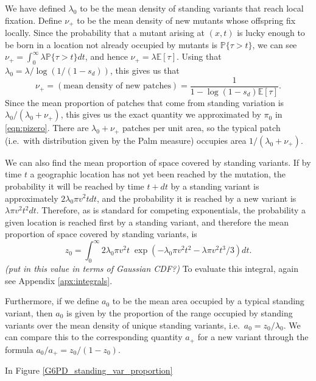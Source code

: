 \documentclass{article}
\renewcommand{\P}{\mathbb{P}}
\newcommand{\E}{\mathbb{E}}
\newcommand{\marginnote}[1]{{\it\color{red}(#1)}}
\begin{document}

We have defined $\lambda_0$ to be the mean density of standing variants that reach local fixation.
Define $\nu_+$ to be the mean density of new mutants whose offspring fix locally.
Since the probability that a mutant arising at $(x,t)$ is lucky enough to be born in a location not already occupied by mutants
is $\P\{ \tau > t \}$,
we can see  $\nu_+ = \int_0^\infty \lambda \P\{\tau>t\} dt$, and hence
$\nu_+ = \lambda \E[\tau] $.
Using that $\lambda_0 = \lambda / \log(1/(1-s_d))$, this gives us that
\begin{equation}
    \nu_+ = (\mbox{mean density of new patches}) = \frac{1}{1-\log(1-s_d) \E[\tau]} .
\end{equation}
Since the mean proportion of patches that come from standing variation is $\lambda_0 / (\lambda_0 + \nu_+)$,
this gives us the exact quantity we approximated by $\pi_0$ in \eqref{eqn:pizero}.
There are $\lambda_0 + \nu_+$ patches per unit area, so
the typical patch (i.e.\ with distribution given by the Palm measure) occupies area $1/(\lambda_0 + \nu_+)$.

We can also find the mean proportion of space covered by standing variants.
If by time $t$ a geographic location has not yet been reached by the mutation,
the probability it will be reached by time $t+dt$ 
by a standing variant is approximately $2 \lambda_0 \pi v^2 t dt$, 
and the probability it is reached by a new variant is $\lambda \pi v^2 t^2 dt$.
Therefore, as is standard for competing exponentials,
the probability a given location is reached first by a standing variant,
and therefore the mean proportion of space covered  by standing variants,
is
\begin{equation}
    z_0 = \int_0^\infty {2 \lambda_0 \pi v^2 t} \; \exp \left( - \lambda_0 \pi v^2 t^2 - \lambda \pi v^2 t^3 / 3 \right) dt .
\end{equation}
\marginnote{put in this value in terms of Gaussian CDF?}
To evaluate this integral, again see Appendix \ref{apx:integrals}.

Furthermore, if we define $a_0$ to be the mean area occupied by a typical standing variant, 
then $a_0$ is given by the proportion of the range occupied by standing variants over the mean density of unique standing variants,
i.e.\ $a_0 = z_0 / \lambda_0$.
We can compare this to the corresponding quantity $a_+$ for a new variant through the formula
$a_0 / a_+ = z_0 / (1-z_0)$.

In Figure \ref{G6PD_standing_var_proportion} 
\end{document}
